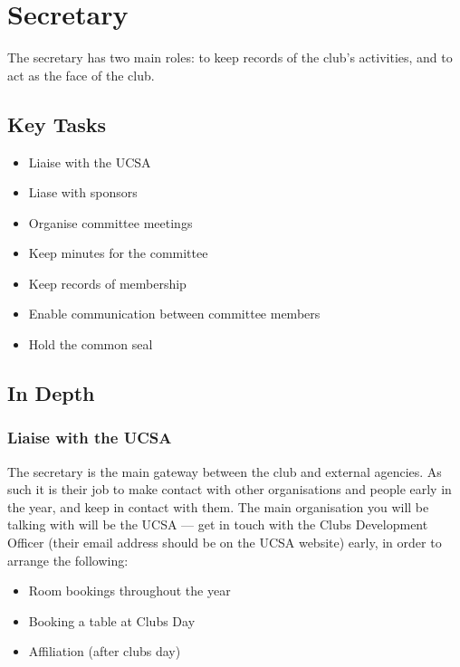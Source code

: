 \section{Secretary}
\label{sec:secretary}

The secretary has two main roles: to keep records of the club's activities, and to act as the face of the club.

\subsection{Key Tasks}
\label{sub:secretary_key_tasks}

\begin{itemize}
  \item Liaise with the UCSA
  \item Liase with sponsors
  \item Organise committee meetings
  \item Keep minutes for the committee
  \item Keep records of membership
  \item Enable communication between committee members
  \item Hold the common seal
\end{itemize}

\subsection{In Depth}

\subsubsection{Liaise with the UCSA}

The secretary is the main gateway between the club and external agencies. As such it is their job to make contact with other organisations and people early in the year, and keep in contact with them. The main organisation you will be talking with will be the UCSA --- get in touch with the Clubs Development Officer (their email address should be on the UCSA website) early, in order to arrange the following:

\begin{itemize}
  \item Room bookings throughout the year
  \item Booking a table at Clubs Day
  \item Affiliation (after clubs day)
\end{itemize}

